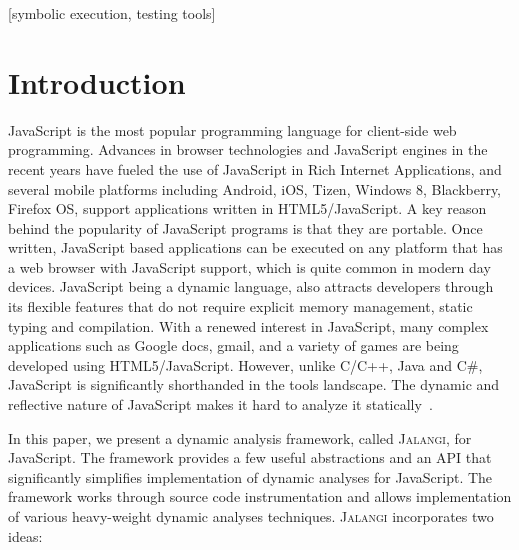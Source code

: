\documentclass{sig-alternate}
\def\jalangi{\textsc{Jalangi}}
\begin{document}
\vspace*{-1ex}
[symbolic
execution, testing tools]
\vspace*{-2ex}
\vspace*{-2ex}

\section{Introduction}

JavaScript is the most popular programming language for client-side
web programming. Advances in browser technologies and JavaScript
engines in the recent years have fueled the use of JavaScript in Rich
Internet Applications, and several mobile platforms including Android,
iOS, Tizen, Windows 8, Blackberry, Firefox OS, support applications written
in HTML5/JavaScript. A key reason behind the popularity of JavaScript
programs is that they are portable. Once written, JavaScript based
applications can be executed on any platform that has a web browser
with JavaScript support, which is quite common in modern day devices.
JavaScript being a dynamic language, also attracts developers through
its flexible features that do not require explicit memory management,
static typing and compilation.  With a renewed interest in JavaScript,
many complex applications such as Google docs, gmail, and a variety of
games are being developed using HTML5/JavaScript. However, unlike
C/C++, Java and C\#, JavaScript is significantly shorthanded in the
tools landscape. The dynamic and reflective nature of JavaScript makes
it hard to analyze it
statically~\cite{Richards:2010:ADB:1806596.1806598,Wei:2012:BAJ:2384716.2384758,Ratanaworabhan:2010:JCB:1863166.1863169}.

In this paper, we present a dynamic analysis framework, called
\jalangi{}, for JavaScript.  The framework provides a few useful
abstractions and an API that significantly simplifies implementation
of dynamic analyses for JavaScript.  The framework works through
source code instrumentation and allows implementation of various
heavy-weight dynamic analyses techniques.  \jalangi{} incorporates two
ideas:
\end{document}

